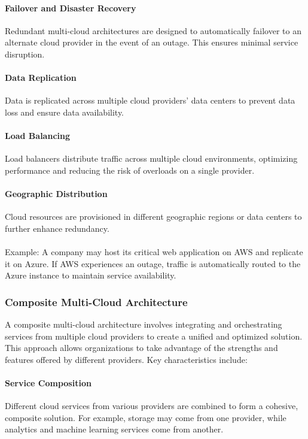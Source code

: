 \paragraph{Failover and Disaster Recovery}
Redundant multi-cloud architectures are designed to automatically failover to an alternate cloud provider in the event of an outage. 
This ensures minimal service disruption.

\paragraph{Data Replication}

Data is replicated across multiple cloud providers' data centers to prevent data loss and ensure data availability.

\paragraph{Load Balancing}
Load balancers distribute traffic across multiple cloud environments, optimizing performance and reducing the risk of overloads on a single provider.


\paragraph{Geographic Distribution}
Cloud resources are provisioned in different geographic regions or data centers to further enhance redundancy.
\\
\\
Example: A company may host its critical web application on AWS and replicate it on Azure. 
If AWS experiences an outage, traffic is automatically routed to the Azure instance to maintain service availability.

\subsubsection{Composite Multi-Cloud Architecture}

A composite multi-cloud architecture involves integrating and orchestrating services from multiple cloud providers to create a unified and optimized solution. 
This approach allows organizations to take advantage of the strengths and features offered by different providers. 
Key characteristics include:

\paragraph{Service Composition}
Different cloud services from various providers are combined to form a cohesive, composite solution. 
For example, storage may come from one provider, while analytics and machine learning services come from another.

